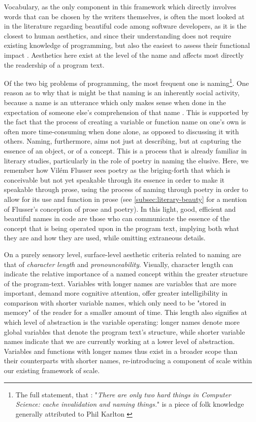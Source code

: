 Vocabulary, as the only component in this framework which directly involves words that can be chosen by the writers themselves, is often the most looked at in the literature regarding beautiful code among software developers, as it is the closest to human aesthetics, and since their understanding does not require existing knowledge of programming, but also the easiest to assess their functional impact \citep{oliveira_systematic_2022}. Aesthetics here exist at the level of the name and affects most directly the readership of a program text.

Of the two big problems of programming, the most frequent one is naming\footnote{The full statement, that : "\emph{There are only two hard things in Computer Science: cache invalidation and naming things.}" is a piece of folk knowledge generally attributed to Phil Karlton \citep{fowler_twohardthings_2009}}. One reason as to why that is might be that naming is an inherently social activity, because a name is an utterance which only makes sense when done in the expectation of someone else's comprehension of that name \citep{voloshinov_marxism_1986}. This is supported by the fact that the process of creating a variable or function name on one's own is often more time-consuming when done alone, as opposed to discussing it with others. Naming, furthermore, aims not just at describing, but at capturing the essence of an object, or of a concept. This is a process that is already familiar in literary studies, particularly in the role of poetry in naming the elusive. Here, we remember how Vilém Flusser sees poetry as the briging-forth that which is conceivable but not yet speakable through its essence in order to make it speakable through prose, using the process of naming through poetry in order to allow for its use and function in prose (see \autoref{subsec:literary-beauty} for a mention of Flusser's conception of prose and poetry). In this light, good, efficient and beautiful names in code are those who can communicate the essence of the concept that is being operated upon in the program text, implying both what they are and how they are used, while omitting extraneous details.

On a purely sensory level, surface-level aesthetic criteria related to naming are that of \emph{character length} and \emph{pronounceability}. Visually, character length can indicate the relative importance of a named concept within the greater structure of the program-text. Variables with longer names are variables that are more important, demand more cognitive attention, offer greater intelligibility in comparison with shorter variable names, which only need to be "stored in memory" of the reader for a smaller amount of time. This length also signifies at which level of abstraction is the variable operating: longer names denote more global variables that denote the program text's structure, while shorter variable names indicate that we are currently working at a lower level of abstraction. Variables and functions with longer names thus exist in a broader scope than their counterparts with shorter names, re-introducing a component of scale within our existing framework of scale.

